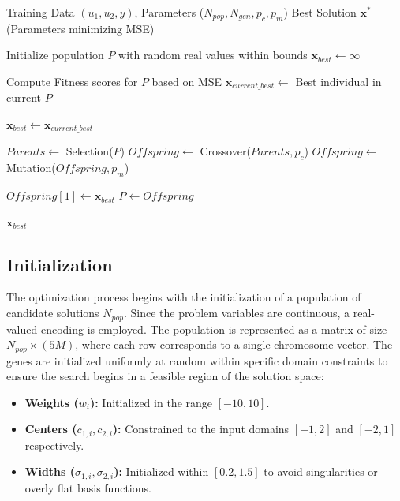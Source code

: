 \documentclass[11pt]{article}
\begin{document}
\begin{algorithm}[H]
\caption{Genetic Algorithm for Function Approximation}
\label{algo:ga}
\begin{algorithmic}[1]
\Require Training Data $(u_1, u_2, y)$, Parameters ($N_{pop}, N_{gen}, p_c, p_m$)
\Ensure Best Solution $\mathbf{x}^*$ (Parameters minimizing MSE)

\State Initialize population $P$ with random real values within bounds
\State $\mathbf{x}_{best} \gets \infty$

    \State Compute Fitness scores for $P$ based on MSE
    \State $\mathbf{x}_{current\_best} \gets$ Best individual in current $P$
    
        \State $\mathbf{x}_{best} \gets \mathbf{x}_{current\_best}$
    \EndIf
    
    \State $Parents \gets$ Selection($P$) 
    \State $Offspring \gets$ Crossover($Parents, p_c$) 
    \State $Offspring \gets$ Mutation($Offspring, p_m$) 
    
    \State $Offspring[1] \gets \mathbf{x}_{best}$ 
    \State $P \gets Offspring$
\EndFor

\State \Return $\mathbf{x}_{best}$
\end{algorithmic}
\end{algorithm}

\subsection{Initialization}

The optimization process begins with the initialization of a population of candidate solutions $N_{pop}$. Since the problem variables are continuous, a real-valued encoding is employed. The population is represented as a matrix of size $N_{pop} \times (5M)$, where each row corresponds to a single chromosome vector. The genes are initialized uniformly at random within specific domain constraints to ensure the search begins in a feasible region of the solution space:

\begin{itemize}
\item \textbf{Weights ($w_i$):} Initialized in the range $[-10, 10]$.
\item \textbf{Centers ($c_{1,i}, c_{2,i}$):} Constrained to the input domains $[-1, 2]$ and $[-2, 1]$ respectively.
\item \textbf{Widths ($\sigma_{1,i}, \sigma_{2,i}$):} Initialized within $[0.2, 1.5]$ to avoid singularities or overly flat basis functions.
\end{itemize}
\end{document}

